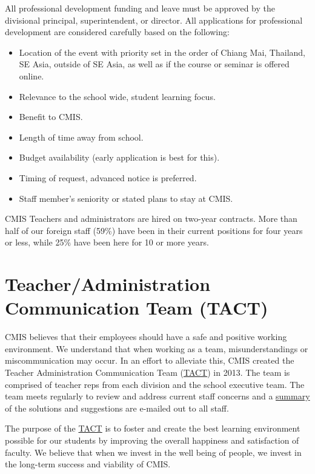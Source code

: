 All professional development funding and leave must be approved by the divisional principal, superintendent, or director.  All applications for professional development are considered carefully based on the following:

\begin{itemize}
\item Location of the event with priority set in the order of Chiang Mai, Thailand, SE Asia, outside of SE Asia, as well as if the course or seminar is offered online.
\item Relevance to the school wide, student learning focus.
\item Benefit to CMIS.
\item Length of time away from school.
\item Budget availability (early application is best for this).
\item Timing of request, advanced notice is preferred.
\item Staff member’s seniority or stated plans to stay at CMIS.
\end{itemize}


CMIS Teachers and administrators are hired on two-year contracts.  More than half of our foreign staff (59\%) have been in their current positions for four years or less, while 25\% have been here for 10 or more years. 

\section{Teacher/Administration Communication Team (TACT)}

CMIS believes that their employees should have a safe and positive working environment. We understand that when working as a team, misunderstandings or miscommunication may occur.  In an effort to alleviate this, CMIS created the Teacher Administration Communication Team (\href{https://docs.google.com/a/cmis.ac.th/document/d/14nhwcw8xo3i-23Q-WUxo6KJ_c8yFKu-jTdCctt4MFcs/edit?usp=sharing}{TACT}) in 2013. The team is comprised of teacher reps from each division and the school executive team. The team meets regularly to review and address current staff concerns and a \href{https://docs.google.com/a/cmis.ac.th/document/d/1KLB4c5_LkxXzq4vP2EuNhBVPp2q_FT9qy1cBBwaS5JM/edit?usp=sharing}{summary} of the solutions and suggestions are e-mailed out to all staff.

The purpose of the \href{https://docs.google.com/document/d/12ZwL4geAPTDcm-SI6U1fRpXEKxKZ-61q54upcikt6lc/edit}{TACT} is to foster and create the best learning environment possible for our students by improving the overall happiness and satisfaction of faculty. We believe that when we invest in the well being of people, we invest in the long-term success and viability of CMIS.

